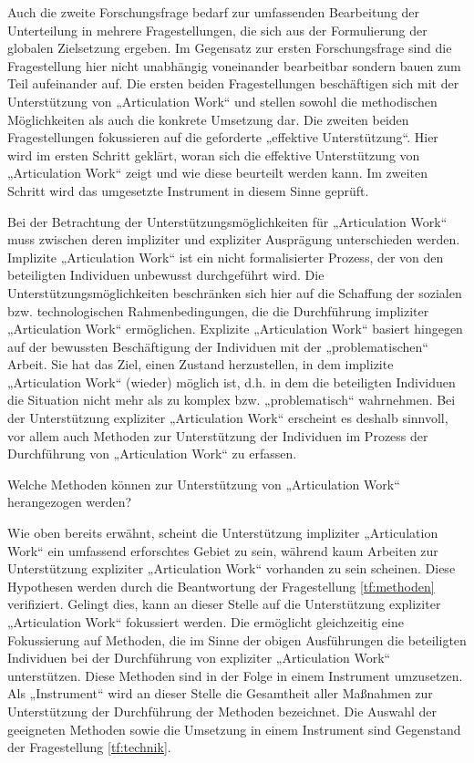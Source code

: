 Auch die zweite Forschungsfrage bedarf zur umfassenden Bearbeitung der Unterteilung in mehrere Fragestellungen, die sich aus der Formulierung der globalen Zielsetzung ergeben. Im Gegensatz zur ersten Forschungsfrage sind die Fragestellung hier nicht unabhängig voneinander bearbeitbar sondern bauen zum Teil aufeinander auf. Die ersten beiden Fragestellungen beschäftigen sich mit der Unterstützung von „Articulation Work“ und stellen sowohl die methodischen Möglichkeiten als auch die konkrete Umsetzung dar. Die zweiten beiden Fragestellungen fokussieren auf die geforderte „effektive Unterstützung“. Hier wird im ersten Schritt geklärt, woran sich die effektive Unterstützung von „Articulation Work“ zeigt und wie diese beurteilt werden kann. Im zweiten Schritt wird das umgesetzte Instrument in diesem Sinne geprüft. 

Bei der Betrachtung der Unterstützungsmöglichkeiten für „Articulation Work“ muss zwischen deren impliziter und expliziter Ausprägung unterschieden werden. Implizite „Articulation Work“ ist ein nicht formalisierter Prozess, der von den beteiligten Individuen unbewusst durchgeführt wird. Die Unterstützungsmöglichkeiten beschränken sich hier auf die Schaffung der sozialen bzw. technologischen Rahmenbedingungen, die die Durchführung impliziter „Articulation Work“ ermöglichen. Explizite „Articulation Work“ basiert hingegen auf der bewussten Beschäftigung der Individuen mit der „problematischen“ Arbeit. Sie hat das Ziel, einen Zustand herzustellen, in dem implizite „Articulation Work“ (wieder) möglich ist, d.h. in dem die beteiligten Individuen die Situation nicht mehr als zu komplex bzw. „problematisch“ wahrnehmen. Bei der Unterstützung expliziter „Articulation Work“ erscheint es deshalb sinnvoll, vor allem auch Methoden zur Unterstützung der Individuen im Prozess der Durchführung von „Articulation Work“ zu erfassen.

\begin{tf}
	\label{tf:methoden}
	Welche Methoden können zur Unterstützung von „Articulation Work“ herangezogen werden?
\end{tf}

Wie oben bereits erwähnt, scheint die Unterstützung impliziter „Articulation Work“ ein umfassend erforschtes Gebiet zu sein, während kaum Arbeiten zur Unterstützung expliziter „Articulation Work“ vorhanden zu sein scheinen. Diese Hypothesen werden durch die Beantwortung der Fragestellung \ref{tf:methoden} verifiziert. Gelingt dies, kann an dieser Stelle auf die Unterstützung expliziter „Articulation Work“ fokussiert werden. Die ermöglicht gleichzeitig eine Fokussierung auf Methoden, die im Sinne der obigen Ausführungen die beteiligten Individuen bei der Durchführung von expliziter „Articulation Work“ unterstützen. Diese Methoden sind in der Folge in einem Instrument umzusetzen. Als „Instrument“ wird an dieser Stelle die Gesamtheit aller Maßnahmen zur Unterstützung der Durchführung der Methoden bezeichnet. Die Auswahl der geeigneten Methoden sowie die Umsetzung in einem Instrument sind Gegenstand der Fragestellung \ref{tf:technik}.

